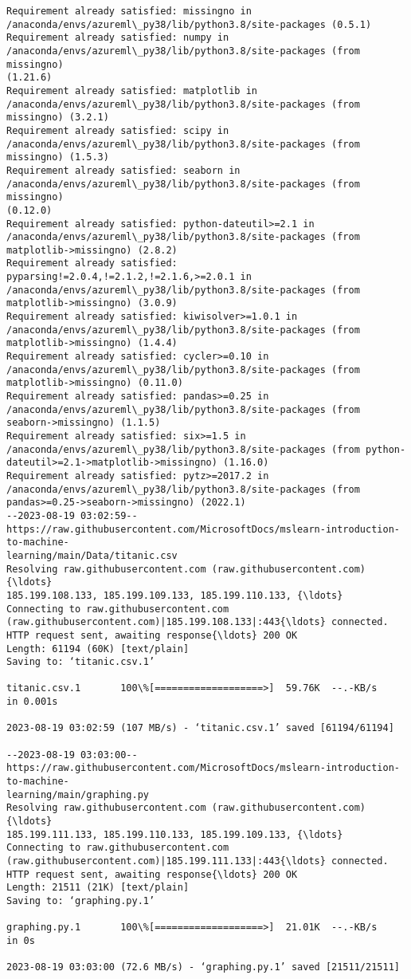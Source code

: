 \documentclass[11pt]{article}
\begin{document}
    \begin{Verbatim}[commandchars=\\\{\}]
Requirement already satisfied: missingno in
/anaconda/envs/azureml\_py38/lib/python3.8/site-packages (0.5.1)
Requirement already satisfied: numpy in
/anaconda/envs/azureml\_py38/lib/python3.8/site-packages (from missingno)
(1.21.6)
Requirement already satisfied: matplotlib in
/anaconda/envs/azureml\_py38/lib/python3.8/site-packages (from missingno) (3.2.1)
Requirement already satisfied: scipy in
/anaconda/envs/azureml\_py38/lib/python3.8/site-packages (from missingno) (1.5.3)
Requirement already satisfied: seaborn in
/anaconda/envs/azureml\_py38/lib/python3.8/site-packages (from missingno)
(0.12.0)
Requirement already satisfied: python-dateutil>=2.1 in
/anaconda/envs/azureml\_py38/lib/python3.8/site-packages (from
matplotlib->missingno) (2.8.2)
Requirement already satisfied: pyparsing!=2.0.4,!=2.1.2,!=2.1.6,>=2.0.1 in
/anaconda/envs/azureml\_py38/lib/python3.8/site-packages (from
matplotlib->missingno) (3.0.9)
Requirement already satisfied: kiwisolver>=1.0.1 in
/anaconda/envs/azureml\_py38/lib/python3.8/site-packages (from
matplotlib->missingno) (1.4.4)
Requirement already satisfied: cycler>=0.10 in
/anaconda/envs/azureml\_py38/lib/python3.8/site-packages (from
matplotlib->missingno) (0.11.0)
Requirement already satisfied: pandas>=0.25 in
/anaconda/envs/azureml\_py38/lib/python3.8/site-packages (from
seaborn->missingno) (1.1.5)
Requirement already satisfied: six>=1.5 in
/anaconda/envs/azureml\_py38/lib/python3.8/site-packages (from python-
dateutil>=2.1->matplotlib->missingno) (1.16.0)
Requirement already satisfied: pytz>=2017.2 in
/anaconda/envs/azureml\_py38/lib/python3.8/site-packages (from
pandas>=0.25->seaborn->missingno) (2022.1)
--2023-08-19 03:02:59--
https://raw.githubusercontent.com/MicrosoftDocs/mslearn-introduction-to-machine-
learning/main/Data/titanic.csv
Resolving raw.githubusercontent.com (raw.githubusercontent.com){\ldots}
185.199.108.133, 185.199.109.133, 185.199.110.133, {\ldots}
Connecting to raw.githubusercontent.com
(raw.githubusercontent.com)|185.199.108.133|:443{\ldots} connected.
HTTP request sent, awaiting response{\ldots} 200 OK
Length: 61194 (60K) [text/plain]
Saving to: ‘titanic.csv.1’

titanic.csv.1       100\%[===================>]  59.76K  --.-KB/s    in 0.001s

2023-08-19 03:02:59 (107 MB/s) - ‘titanic.csv.1’ saved [61194/61194]

--2023-08-19 03:03:00--
https://raw.githubusercontent.com/MicrosoftDocs/mslearn-introduction-to-machine-
learning/main/graphing.py
Resolving raw.githubusercontent.com (raw.githubusercontent.com){\ldots}
185.199.111.133, 185.199.110.133, 185.199.109.133, {\ldots}
Connecting to raw.githubusercontent.com
(raw.githubusercontent.com)|185.199.111.133|:443{\ldots} connected.
HTTP request sent, awaiting response{\ldots} 200 OK
Length: 21511 (21K) [text/plain]
Saving to: ‘graphing.py.1’

graphing.py.1       100\%[===================>]  21.01K  --.-KB/s    in 0s

2023-08-19 03:03:00 (72.6 MB/s) - ‘graphing.py.1’ saved [21511/21511]

    \end{Verbatim}
\end{document}
